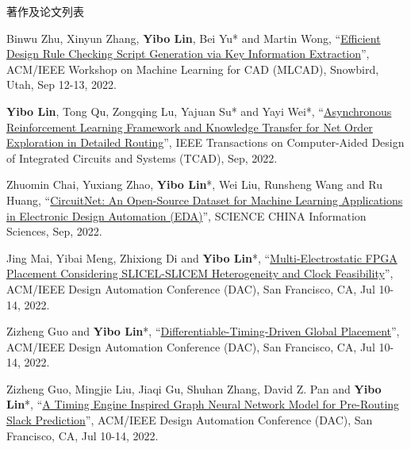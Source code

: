 \begin{rSection}{著作及论文列表}
\begin{description}[font=\normalfont, rightmargin=2em]
\item[{[C99]}]{
        Binwu Zhu, Xinyun Zhang, \textbf{Yibo Lin}, Bei Yu* and Martin Wong, 
    ``\href{https://doi.org/10.1145/3551901.3556494}{Efficient Design Rule Checking Script Generation via Key Information Extraction}'', 
    ACM/IEEE Workshop on Machine Learning for CAD (MLCAD), Snowbird, Utah, Sep 12-13, 2022.
    
}
            

\item[{[J98]}]{
        \textbf{Yibo Lin}, Tong Qu, Zongqing Lu, Yajuan Su* and Yayi Wei*, 
    ``\href{https://doi.org/10.1109/TCAD.2021.3117505}{Asynchronous Reinforcement Learning Framework and Knowledge Transfer for Net Order Exploration in Detailed Routing}'', 
    IEEE Transactions on Computer-Aided Design of Integrated Circuits and Systems (TCAD), Sep, 2022.
    
}
            

\item[{[J97]}]{
        Zhuomin Chai, Yuxiang Zhao, \textbf{Yibo Lin}*, Wei Liu, Runsheng Wang and Ru Huang, 
    ``\href{https://doi.org/10.1007/s11432-022-3571-8}{CircuitNet: An Open-Source Dataset for Machine Learning Applications in Electronic Design Automation (EDA)}'', 
    SCIENCE CHINA Information Sciences, Sep, 2022.
    
}
            

\item[{[C96]}]{
        Jing Mai, Yibai Meng, Zhixiong Di and \textbf{Yibo Lin}*, 
    ``\href{https://doi.org/10.1145/3489517.3530568}{Multi-Electrostatic FPGA Placement Considering SLICEL-SLICEM Heterogeneity and Clock Feasibility}'', 
    ACM/IEEE Design Automation Conference (DAC), San Francisco, CA, Jul 10-14, 2022.
    
}
            

\item[{[C95]}]{
        Zizheng Guo and \textbf{Yibo Lin}*, 
    ``\href{https://doi.org/10.1145/3489517.3530486}{Differentiable-Timing-Driven Global Placement}'', 
    ACM/IEEE Design Automation Conference (DAC), San Francisco, CA, Jul 10-14, 2022.
    
}
            

\item[{[C94]}]{
        Zizheng Guo, Mingjie Liu, Jiaqi Gu, Shuhan Zhang, David Z. Pan and \textbf{Yibo Lin}*, 
    ``\href{https://doi.org/10.1145/3489517.3530597}{A Timing Engine Inspired Graph Neural Network Model for Pre-Routing Slack Prediction}'', 
    ACM/IEEE Design Automation Conference (DAC), San Francisco, CA, Jul 10-14, 2022.
    
}
\end{description}
\end{rSection}

